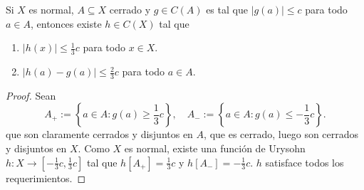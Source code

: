 \documentclass[topologia-analisis.tex]{subfiles}
\begin{document}
\begin{lem}
	Si $X$ es normal, $A\subseteq X$ cerrado y $g \in C(A)$ es tal que $|g(a)| \le c$ para todo $a\in A$, entonces existe $h \in C(X)$ tal que
	\begin{enumerate}
		\item $|h(x)| \le \frac{1}{3}c$ para todo $x\in X$.
		\item $|h(a) - g(a)| \le \frac{2}{3}c$ para todo $a\in A$.
	\end{enumerate}
\end{lem}
\begin{proof}
	Sean
	$$ A_+ := \left\{ a\in A: g(a) \ge \frac{1}{3}c \right\},\quad A_- := \left\{ a\in A: g(a) \le -\frac{1}{3}c \right\}. $$
	que son claramente cerrados y disjuntos en $A$, que es cerrado, luego son cerrados y disjuntos en $X$.
	Como $X$ es normal, existe una función de Urysohn $h\colon X \to \left[ -\frac{1}{3}c, \frac{1}{3}c \right]$
	tal que $h[A_+] = \frac{1}{3}c$ y $h[A_-] = -\frac{1}{3}c$.
	$h$ satisface todos los requerimientos.
\end{proof}
\end{document}
